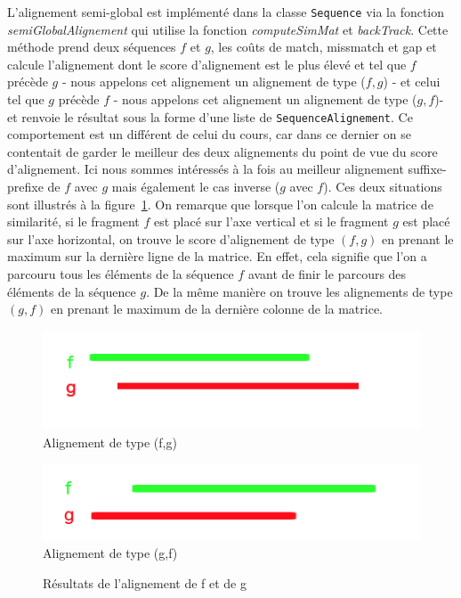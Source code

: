  L'alignement semi-global est implémenté dans la classe \verb|Sequence| via la fonction \emph{semiGlobalAlignement} qui utilise la fonction \emph{computeSimMat} et \emph{backTrack}. Cette méthode prend deux séquences $f$ et $g$, les coûts de match, missmatch et gap et calcule l'alignement dont le score d'alignement est le plus élevé et  tel que $f$ précède $g$ - nous appelons cet alignement un alignement de type ($f,g$) - et celui tel que $g$ précède $f$ - nous appelons cet alignement un alignement de type ($g,f$)- et renvoie le résultat sous la forme d'une liste de \verb|SequenceAlignement|. Ce comportement est un différent de celui du cours, car dans ce dernier on se contentait de garder le meilleur des deux alignements du point de vue du score d'alignement. Ici nous sommes intéressés à la fois  au meilleur alignement suffixe-prefixe de $f$ avec $g$ mais également le cas inverse ($g$ avec $f$). Ces deux situations sont illustrés à la figure~\ref{fig:alignementType}.
On remarque que lorsque l'on calcule la matrice de similarité, si le fragment $f$ est placé sur l'axe vertical et si le fragment $g$ est placé sur l'axe horizontal, on trouve le score d'alignement de type $(f,g)$ en prenant le maximum sur la dernière ligne de la matrice. En effet, cela signifie que l'on a parcouru tous les éléments de la séquence $f$ avant de finir le parcours des éléments de la séquence $g$. De la même manière on trouve les alignements de type $(g,f)$ en prenant le maximum de la dernière colonne de la matrice.\\

\begin{figure}
	\begin{minipage}[r]{.46\linewidth}
		\begin{center}
		\includegraphics[scale= 0.50]{(f,g).png}
		Alignement de type (f,g)
	\end{center}
	   \end{minipage} \hfill
	   \begin{minipage}[c]{.46\linewidth}
		\begin{center}
			\includegraphics[scale= 0.50]{(g,f).png}
			Alignement de type (g,f)
		\end{center}
			  \end{minipage}
		\caption{Résultats de l'alignement de f et de g}
		\label{fig:alignementType}
\end{figure}


